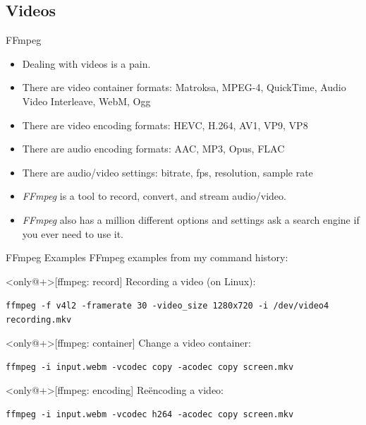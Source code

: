 \subsection{Videos}
\begin{frame}{FFmpeg}
  \begin{itemize}
    \item Dealing with videos is a pain.
    \pause
    \item There are video container formats: Matroksa, MPEG-4, QuickTime, Audio Video Interleave, WebM, Ogg
    \pause
    \item There are video encoding formats: HEVC, H.264, AV1, VP9, VP8
    \pause
    \item There are audio encoding formats: AAC, MP3, Opus, FLAC
    \pause
    \item There are audio/video settings: bitrate, fps, resolution, sample
      rate
    \pause
    \item \textit{FFmpeg} is a tool to record, convert, and stream
      audio/video.
    \pause
    \item \textit{FFmpeg} also has a million different options and
      settings\textellipsis{} ask a search engine if you ever need to use it.
  \end{itemize}
\end{frame}

\begin{frame}[fragile]{FFmpeg Examples}
  FFmpeg examples from my command history:
  \vfill

  \begin{example}<only@+>[ffmpeg: record]
    Recording a video (on Linux):

    \texttt{ffmpeg -f v4l2 -framerate 30 -video\_size 1280x720 -i /dev/video4 recording.mkv}
  \end{example}
  \begin{example}<only@+>[ffmpeg: container]
    Change a video container:

    \texttt{ffmpeg -i input.webm -vcodec copy -acodec copy screen.mkv}
  \end{example}
  \begin{example}<only@+>[ffmpeg: encoding]
    Reëncoding a video:

    \texttt{ffmpeg -i input.webm -vcodec h264 -acodec copy screen.mkv}
  \end{example}
  \vfill
\end{frame}

